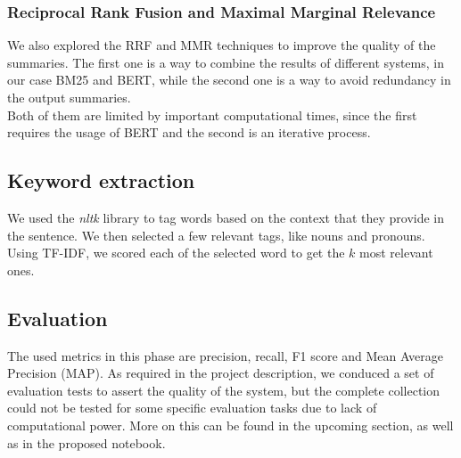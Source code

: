 \subsubsection*{Reciprocal Rank Fusion and Maximal Marginal Relevance}
We also explored the RRF and MMR techniques to improve the quality of the summaries. The first one is a way to combine the results of different systems, in our case BM25 and BERT, while the second one is a way to avoid redundancy in the output summaries.\\ Both of them are limited by important computational times, since the first requires the usage of BERT and the second is an iterative process.

\subsection{Keyword extraction}
We used the \emph{nltk} library to tag words based on the context that they provide in the sentence. We then selected a few relevant tags, like nouns and pronouns. Using TF-IDF, we scored each of the selected word to get the $k$ most relevant ones. 

\subsection{Evaluation}
The used metrics in this phase are precision, recall, F1 score and Mean Average Precision (MAP).
As required in the project description, we conduced a set of evaluation tests to assert the quality of the system, but the complete collection could not be tested for some specific evaluation tasks due to lack of computational power. More on this can be found in the upcoming section, as well as in the proposed notebook.